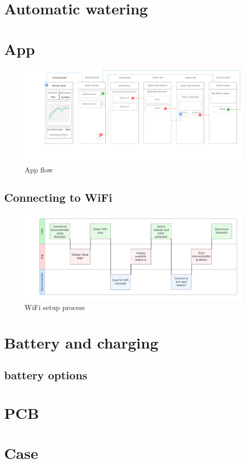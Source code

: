 \section{Automatic watering}

\section{App}

\begin{figure}[!h]
    \centering
    \includegraphics[width= \textwidth]{Report/detail_design/fig/app_flow.png}
    \caption{App flow}
    \label{fig:app_flow}
\end{figure}

\subsection{Connecting to WiFi}
\begin{figure}[!h]
    \centering
    \includegraphics[width= \textwidth]{Report/detail_design/fig/wifi_connect.png}
    \caption{WiFi setup process}
    \label{fig:wifi_setup}
\end{figure}

\section{Battery and charging}
\label{sec:battery}
\subsection{battery options}

\section{PCB}

\section{Case}
